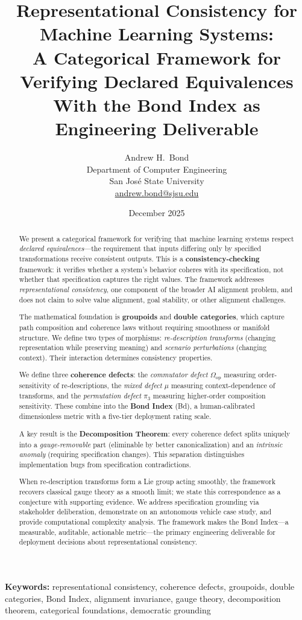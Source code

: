 \documentclass[12pt]{article}
\title{Representational Consistency for Machine Learning Systems:\\
A Categorical Framework for Verifying Declared Equivalences\\
With the Bond Index as Engineering Deliverable}
\author{Andrew H.\ Bond\\
Department of Computer Engineering\\
San Jos\'{e} State University\\
\href{mailto:andrew.bond@sjsu.edu}{andrew.bond@sjsu.edu}}
\date{December 2025}
\begin{document}
\maketitle

\noindent\textbf{Keywords:} representational consistency, coherence defects, groupoids, double categories, Bond Index, alignment invariance, gauge theory, decomposition theorem, categorical foundations, democratic grounding

\begin{abstract}
We present a categorical framework for verifying that machine learning systems respect \emph{declared equivalences}---the requirement that inputs differing only by specified transformations receive consistent outputs. This is a \textbf{consistency-checking} framework: it verifies whether a system's behavior coheres with its specification, not whether that specification captures the right values. The framework addresses \emph{representational consistency}, one component of the broader AI alignment problem, and does not claim to solve value alignment, goal stability, or other alignment challenges.

The mathematical foundation is \textbf{groupoids} and \textbf{double categories}, which capture path composition and coherence laws without requiring smoothness or manifold structure. We define two types of morphisms: \emph{re-description transforms} (changing representation while preserving meaning) and \emph{scenario perturbations} (changing context). Their interaction determines consistency properties.

We define three \textbf{coherence defects}: the \emph{commutator defect} $\Omega_{\mathrm{op}}$ measuring order-sensitivity of re-descriptions, the \emph{mixed defect} $\mu$ measuring context-dependence of transforms, and the \emph{permutation defect} $\pi_3$ measuring higher-order composition sensitivity. These combine into the \textbf{Bond Index} (Bd), a human-calibrated dimensionless metric with a five-tier deployment rating scale.

A key result is the \textbf{Decomposition Theorem}: every coherence defect splits uniquely into a \emph{gauge-removable} part (eliminable by better canonicalization) and an \emph{intrinsic anomaly} (requiring specification changes). This separation distinguishes implementation bugs from specification contradictions.

When re-description transforms form a Lie group acting smoothly, the framework recovers classical gauge theory as a smooth limit; we state this correspondence as a conjecture with supporting evidence. We address specification grounding via stakeholder deliberation, demonstrate on an autonomous vehicle case study, and provide computational complexity analysis. The framework makes the Bond Index---a measurable, auditable, actionable metric---the primary engineering deliverable for deployment decisions about representational consistency.
\end{abstract}
\end{document}
